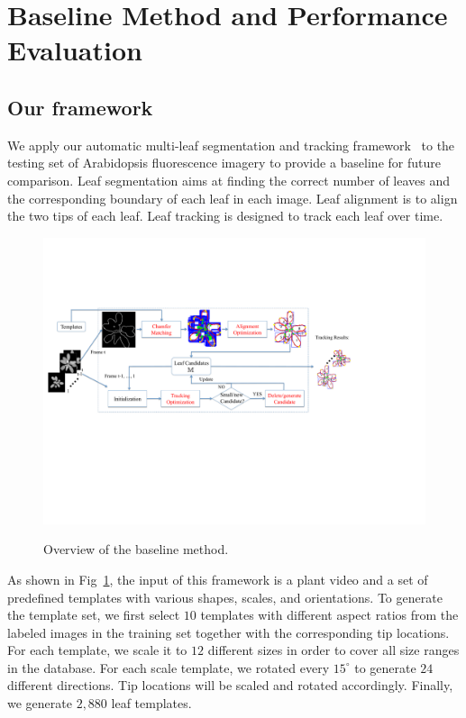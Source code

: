 \section{Baseline Method and Performance Evaluation}
\label{sec:baseline}
\subsection{Our framework}
We apply our automatic multi-leaf segmentation and tracking framework~\cite{yin2014a,yin2014b} to the testing set of Arabidopsis fluorescence imagery to provide a baseline for future comparison.
Leaf segmentation aims at finding the correct number of leaves and the corresponding boundary of each leaf in each image.
Leaf alignment is to align the two tips of each leaf.
Leaf tracking is designed to track each leaf over time.


\begin{figure}
\centering
\includegraphics[width=.98\textwidth]{Figures/overview}\\
\caption{Overview of the baseline method.}
\label{fig:methodOverview}
\end{figure}

As shown in Fig~\ref{fig:methodOverview}, the input of this framework is a plant video and a set of predefined templates with various shapes, scales, and orientations.
To generate the template set, we first select $10$ templates with different aspect ratios from the labeled images in the training set together with the corresponding tip locations.
For each template, we scale it to $12$ different sizes in order to cover all size ranges in the database.
For each scale template, we rotated every $15^{\circ}$ to generate $24$ different directions.
Tip locations will be scaled and rotated accordingly.
Finally, we generate $2,880$ leaf templates.


